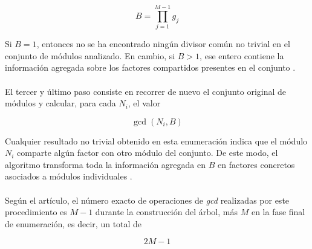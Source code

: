 \[
B = \prod_{j=1}^{M-1} g_j
\]

Si \(B = 1\), entonces no se ha encontrado ningún divisor común no trivial en el conjunto de módulos analizado. En cambio, si \(B > 1\), ese entero contiene la información agregada sobre los factores compartidos presentes en el conjunto \cite{pelofske2024efficient}.
\\
\\
El tercer y último paso consiste en recorrer de nuevo el conjunto original de módulos y calcular, para cada \(N_i\), el valor

\[
\gcd(N_i, B)
\]

Cualquier resultado no trivial obtenido en esta enumeración indica que el módulo \(N_i\) comparte algún factor con otro módulo del conjunto. De este modo, el algoritmo transforma toda la información agregada en \(B\) en factores concretos asociados a módulos individuales \cite{pelofske2024efficient}.
\\
\\
Según el artículo, el número exacto de operaciones de \textit{gcd} realizadas por este procedimiento es \(M-1\) durante la construcción del árbol, más \(M\) en la fase final de enumeración, es decir, un total de

\[
2M - 1
\]

